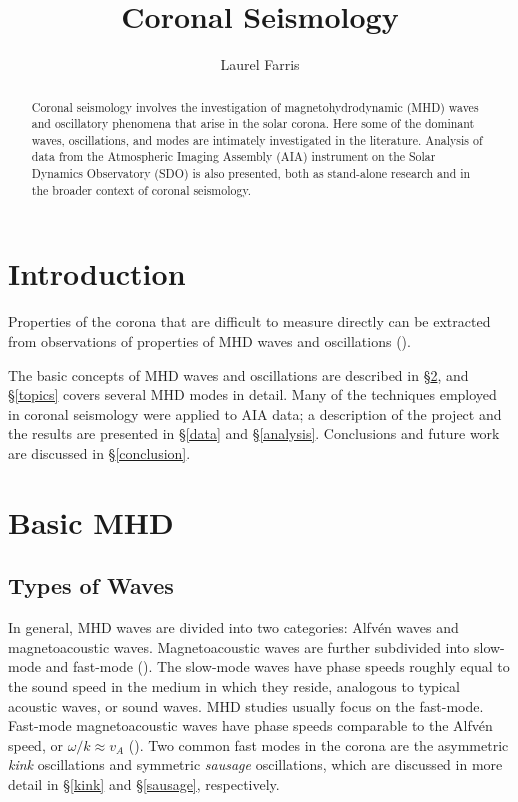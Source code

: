 \documentclass[preprint2]{aastex}
\begin{document}
\title{\vspace{-0.75in}Coronal Seismology}
\author{\vspace{-0.25in}Laurel Farris}

\begin{abstract}
Coronal seismology involves the investigation of magnetohydrodynamic
(MHD) waves and
oscillatory phenomena that arise in the solar corona. Here some of the
dominant waves, oscillations, and modes are intimately investigated in
the literature. Analysis of data from the Atmospheric Imaging
Assembly (AIA) instrument on the Solar Dynamics Observatory (SDO) is
also presented, both as stand-alone research and in the broader
context of coronal seismology.
\end{abstract}

\section{Introduction}\label{intro}
Properties of the corona that are difficult to measure directly
can be extracted from observations of properties of MHD waves and
oscillations (\cite{tor_2}).

The basic concepts of MHD waves and oscillations are described in
\S\ref{MHD}, and
\S\ref{topics} covers several MHD modes in detail.
Many of the techniques employed in coronal seismology were applied to AIA
data; a description of the project and the results are presented in
\S\ref{data} and \S\ref{analysis}.
Conclusions and future work are discussed in
\S\ref{conclusion}.
\section{Basic MHD}\label{MHD}
\subsection{Types of Waves}
In general, MHD waves are divided into two categories:
Alfv\'en waves and magnetoacoustic waves.
Magnetoacoustic waves are further subdivided into
slow-mode and fast-mode (\cite{Asc}).
The slow-mode waves have phase speeds roughly equal to the sound speed
in the medium in which they reside, analogous to typical acoustic waves,
or sound waves. MHD studies usually focus on the fast-mode.
Fast-mode magnetoacoustic waves have phase speeds comparable to the Alfv\'en
speed, or $\omega/k \approx v_A$ (\cite{kink_1}).
Two common fast modes in the corona are the asymmetric \emph{kink}
oscillations and symmetric \emph{sausage} oscillations,
which are discussed in more detail
in \S{\ref{kink}} and \S{\ref{sausage}}, respectively.
\end{document}
